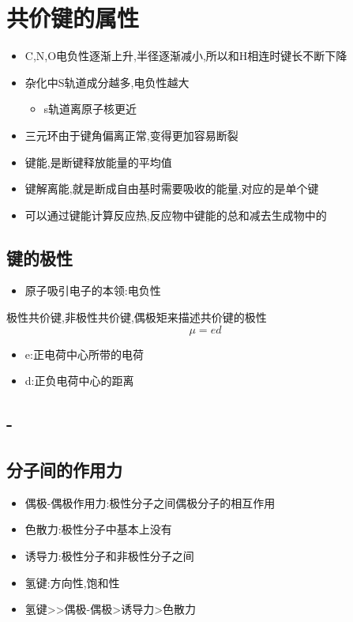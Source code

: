 \documentclass[11pt]{article}
\author{MKQ}
\date{\today}
\title{}
\begin{document}
\tableofcontents

\section{共价键的属性}
\label{sec:orgac725ff}
\begin{itemize}
\item C,N,O电负性逐渐上升,半径逐渐减小,所以和H相连时键长不断下降
\item 杂化中S轨道成分越多,电负性越大
\begin{itemize}
\item s轨道离原子核更近
\end{itemize}
\item 三元环由于键角偏离正常,变得更加容易断裂
\item 键能,是断键释放能量的平均值
\item 键解离能,就是断成自由基时需要吸收的能量,对应的是单个键
\item 可以通过键能计算反应热,反应物中键能的总和减去生成物中的
\end{itemize}
\subsection{键的极性}
\label{sec:orgecdcaed}
\begin{itemize}
\item 原子吸引电子的本领:电负性
\end{itemize}
极性共价键,非极性共价键,偶极矩来描述共价键的极性
\[
\mu = ed
\]
\begin{itemize}
\item e:正电荷中心所带的电荷
\item d:正负电荷中心的距离
\end{itemize}
\subsection{-}
\label{sec:org0b70e11}
\subsection{分子间的作用力}
\label{sec:orgcc9f5c6}
\begin{itemize}
\item 偶极-偶极作用力:极性分子之间偶极分子的相互作用
\item 色散力:极性分子中基本上没有
\item 诱导力:极性分子和非极性分子之间
\item 氢键:方向性,饱和性
\item 氢键>>偶极-偶极>诱导力>色散力
\end{itemize}
\end{document}
